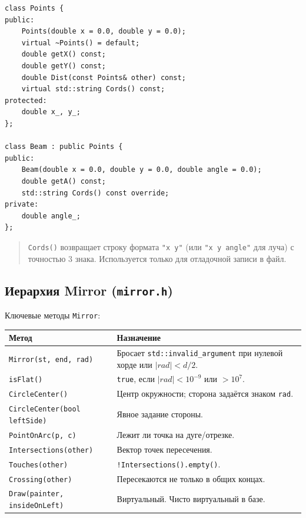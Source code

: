 \documentclass[a4paper,11pt]{article}
\newcommand{\file}[1]{\texttt{#1}}
\newcommand{\code}[1]{\texttt{#1}}
\begin{document}
\begin{lstlisting}[caption={Points / Beam}]
class Points {
public:
    Points(double x = 0.0, double y = 0.0);
    virtual ~Points() = default;
    double getX() const;
    double getY() const;
    double Dist(const Points& other) const;
    virtual std::string Cords() const;
protected:
    double x_, y_;
};

class Beam : public Points {
public:
    Beam(double x = 0.0, double y = 0.0, double angle = 0.0);
    double getA() const;
    std::string Cords() const override;
private:
    double angle_;
};
\end{lstlisting}

\begin{quote}
\code{Cords()} возвращает строку формата \code{"x y"} (или
\code{"x y angle"} для луча) с точностью 3 знака. Используется только
для отладочной записи в файл.
\end{quote}

\subsection{Иерархия Mirror (\file{mirror.h})}

Ключевые методы \code{Mirror}:

\begin{longtable}{@{}p{6.3cm}p{8.2cm}@{}}
\toprule
\textbf{Метод} & \textbf{Назначение} \\ \midrule
\endhead
\code{Mirror(st, end, rad)} & Бросает \code{std::invalid\_argument} при нулевой хорде или $|rad| < d/2$. \\
\code{isFlat()} & \code{true}, если $|rad| < 10^{-9}$ или $> 10^{7}$. \\
\code{CircleCenter()} & Центр окружности; сторона задаётся знаком \code{rad}. \\
\code{CircleCenter(bool leftSide)} & Явное задание стороны. \\
\code{PointOnArc(p, c)} & Лежит ли точка на дуге/отрезке. \\
\code{Intersections(other)} & Вектор точек пересечения. \\
\code{Touches(other)} & \code{!Intersections().empty()}. \\
\code{Crossing(other)} & Пересекаются не только в общих концах. \\
\code{Draw(painter, insideOnLeft)} & Виртуальный. Чисто виртуальный в базе. \\
\bottomrule
\end{longtable}
\end{document}
